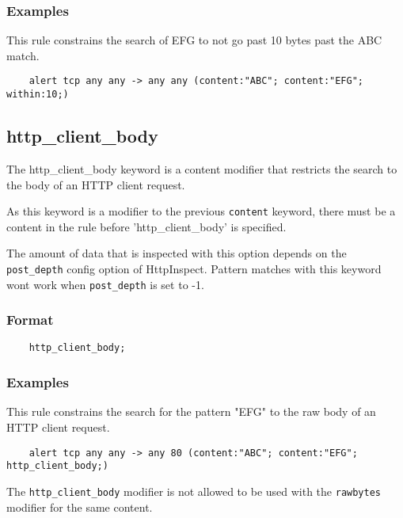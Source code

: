 \documentclass[english]{report}
\newenvironment{note}{
\samepage
    \vspace{10pt}{\textsf{
        {\hspace{7pt}\Huge{$\triangle$\hspace{-12.5pt}{\Large{$^!$}}}}\hspace{5pt}
        {\Large{NOTE}}
    }
    }
   \begin{center}
    \par\vspace{-17pt}

    \begin{lrbox}{\savepar}
    \begin{minipage}[r]{6in}
}
{
    \end{minipage}
    \end{lrbox}
    \fbox{
        \usebox{
            \savepar
	}
    }
    \par\vskip10pt
    \end{center}
}
\newenvironment{note}{
        \begin{rawhtml}
        <p><table border="1"><tr><td><b>
        Note:&nbsp;&nbsp;</b>
        \end{rawhtml}
}{
        \begin{rawhtml}
        </b></td></tr></table></p>
        \end{rawhtml}
}
\begin{document}
\subsubsection{Examples}

This rule constrains the search of EFG to not go past 10 bytes past the ABC match. 

\begin{verbatim}
    alert tcp any any -> any any (content:"ABC"; content:"EFG"; within:10;)
\end{verbatim}

\subsection{http\_client\_body}
\label{sub:HttpClientBody}

The http\_client\_body keyword is a content modifier that restricts the search
to the body of an HTTP client request.

As this keyword is a modifier to the previous \texttt{content} keyword, there must be
a content in the rule before 'http\_client\_body' is specified. 

The amount of data that is inspected with this option depends on the \texttt{post\_depth}
config option of HttpInspect. Pattern matches with this keyword wont work when 
 \texttt{post\_depth} is set to -1.

\subsubsection{Format}

\begin{verbatim}
    http_client_body;
\end{verbatim}

\subsubsection{Examples}

This rule constrains the search for the pattern "EFG" to the raw body of
an HTTP client request.

\begin{verbatim}
    alert tcp any any -> any 80 (content:"ABC"; content:"EFG"; http_client_body;)
\end{verbatim}

\begin{note}
The \texttt{http\_client\_body} modifier is not allowed to be used with
the \texttt{rawbytes} modifier for the same content.
\end{note}
\end{document}
